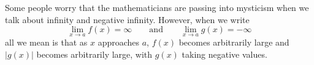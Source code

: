 \documentclass{ximera}
\begin{document}
Some people worry that the mathematicians are passing into mysticism
when we talk about infinity and negative infinity. However, when we write
\[
\lim_{x\to a} f(x) = \infty \qquad\text{and}\qquad \lim_{x\to a} g(x) = -\infty
\]
all we mean is that as $x$ approaches $a$, $f(x)$ becomes arbitrarily
large and $|g(x)|$ becomes arbitrarily large, with $g(x)$ taking
negative values.
\end{document}
